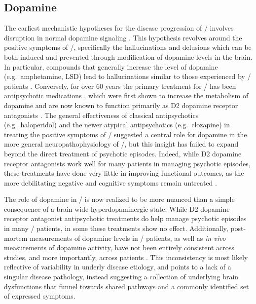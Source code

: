 \subsection{Dopamine}
\label{sec:intro:scz:dopamine}
The earliest mechanistic hypotheses for the disease progression of \scz/ involves disruption in normal dopamine signaling \citep{Matthysse1973}.
This hypothesis revolves around the positive symptoms of \scz/, specifically the hallucinations and delusions which can be both induced and prevented through modification of dopamine levels in the brain.
In particular, compounds that generally increase the level of dopamine (e.g.~amphetamine, LSD) lead to hallucinations similar to those experienced by \scz/ patients \citep{Angrist1994, Lieberman1987}.
Conversely, for over 60 years the primary treatment for \scz/ has been antipsychotic medications \citep{Delay1952}, which were first shown to increase the metabolism of dopamine \citep{Carlsson1963} and are now known to function primarily as D2 dopamine receptor antagonists \citep{Kapur2003}.
The general effectiveness of classical antipsychotics (e.g.~haloperidol) and the newer atypical antipsychotics (e.g.~clozapine) in treating the positive symptoms of \scz/ suggested a central role for dopamine in the more general neuropathophysiology of \scz/, but this insight has failed to expand beyond the direct treatment of psychotic episodes.
Indeed, while D2 dopamine receptor antagonists work well for many patients in managing psychotic episodes, these treatments have done very little in improving functional outcomes, as the more debilitating negative and cognitive symptoms remain untreated \citep{Insel2010a}.

The role of dopamine in \scz/ is now realized to be more nuanced than a simple consequence of a brain-wide hyperdopaminergic state.
While D2 dopamine receptor antagonist antipsychotic treatments do help manage psychotic episodes in many \scz/ patients, in some these treatments show no effect.
Additionally, post-mortem measurements of dopamine levels in \scz/ patients, as well as \textit{in vivo} measurements of dopamine activity, have not been entirely consistent across studies, and more importantly, across patients \citep{Davis1991}.
This inconsistency is most likely reflective of variability in underly disease etiology, and points to a lack of a singular disease pathology, instead suggesting a collection of underlying brain dysfunctions that funnel towards shared pathways and a commonly identified set of expressed symptoms.

